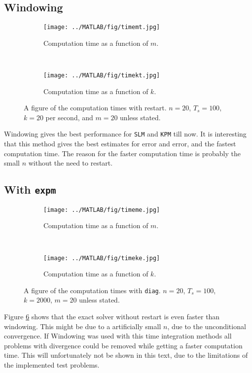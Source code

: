 \subsection{Windowing}
\begin{figure}[H]
        \centering
        \begin{subfigure}[b]{0.45\textwidth}
                \texttt{[image: ../MATLAB/fig/timemt.jpg]}
                \caption{ Computation time as a function of $m$. }
                \label{fig:timemt}
        \end{subfigure}
        ~
        \begin{subfigure}[b]{0.45\textwidth}
                \texttt{[image: ../MATLAB/fig/timekt.jpg]}
                \caption{ Computation time as a function of $k$. }
                \label{fig:timekt}
        \end{subfigure}
        \caption{ A figure of the computation times with restart. $n = 20$, $T_s = 100$, $k = 20$ per second, and $m = 20$ unless stated. }
        \label{fig:time2}
\end{figure}
Windowing gives the best performance for \texttt{SLM} and \texttt{KPM} till now. It is interesting that this method gives the best estimates for error and error, and the fastest computation time. The reason for the faster computation time is probably the small $n$ without the need to restart. 
\subsection{With \texttt{expm}}
\begin{figure}[H]
        \centering
        \begin{subfigure}[b]{0.45\textwidth}
                \texttt{[image: ../MATLAB/fig/timeme.jpg]}
                \caption{ Computation time as a function of $m$. }
                \label{fig:timeme}
        \end{subfigure}
        ~
        \begin{subfigure}[b]{0.45\textwidth}
                \texttt{[image: ../MATLAB/fig/timeke.jpg]}
                \caption{ Computation time as a function of $k$. }
                \label{fig:timeke}
        \end{subfigure}
        \caption{ A figure of the computation times with \texttt{diag}. $n = 20$, $T_s = 100$, $k = 2000$, $m = 20$ unless stated. }
        \label{fig:time3}
\end{figure}
Figure \ref{fig:time3} shows that the exact solver without restart is even faster than windowing. This might be due to a artificially small $n$, due to the unconditional convergence. If Windowing was used with this time integration methods all problems with divergence could be removed while getting a faster computation time. This will unfortunately not be shown in this text, due to the limitations of the implemented test problems.
